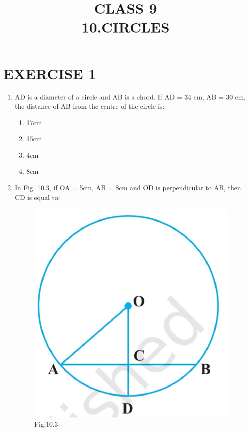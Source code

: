 \documentclass{article}
\begin{document}
 
\title{CLASS 9\\10.CIRCLES}
\date{}
\maketitle
\section{EXERCISE 1}
\begin{enumerate}
\item AD is a diameter of a circle and AB is a chord. If AD = 34 cm, AB = 30 cm, the distance of AB from the centre of the circle is:
\begin{enumerate}
\item 17cm
\item 15cm
\item 4cm
\item 8cm
\end{enumerate}
\item In Fig. 10.3, if OA = 5cm, AB = 8cm and OD is perpendicular to AB, then CD is equal to:
\begin{figure}[H]
\centering
\includegraphics[width=\columnwidth]{Figs/10.3.jpg}
\caption*{Fig:10.3}
\end{figure}

\end{enumerate}
\end{document}
